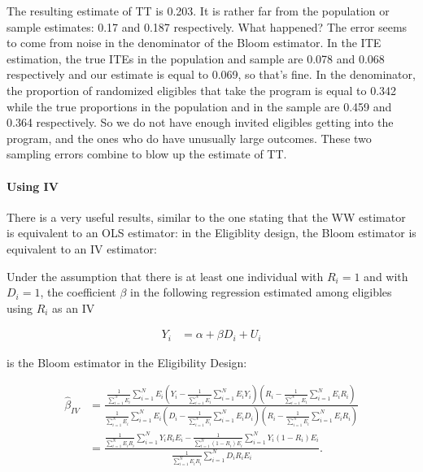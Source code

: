 \documentclass[]{book}
\let\oldparagraph\paragraph
\renewcommand{\paragraph}[1]{\oldparagraph{#1}\mbox{}}
\theoremstyle{definition}
\theoremstyle{definition}
\theoremstyle{definition}
\theoremstyle{remark}
\let\BeginKnitrBlock\begin \let\EndKnitrBlock\end
\begin{document}
The resulting estimate of TT is 0.203. It is rather far from the
population or sample estimates: 0.17 and 0.187 respectively. What
happened? The error seems to come from noise in the denominator of the
Bloom estimator. In the ITE estimation, the true ITEs in the population
and sample are 0.078 and 0.068 respectively and our estimate is equal to
0.069, so that's fine. In the denominator, the proportion of randomized
eligibles that take the program is equal to 0.342 while the true
proportions in the population and in the sample are 0.459 and 0.364
respectively. So we do not have enough invited eligibles getting into
the program, and the ones who do have unusually large outcomes. These
two sampling errors combine to blow up the estimate of TT.

\paragraph{Using IV}\label{using-iv}

There is a very useful results, similar to the one stating that the WW
estimator is equivalent to an OLS estimator: in the Eligiblity design,
the Bloom estimator is equivalent to an IV estimator:

\BeginKnitrBlock{theorem}[Bloom is IV]
\protect\hypertarget{thm:BloomIV}{}{\label{thm:BloomIV} \iffalse (Bloom is
IV) \fi{} }Under the assumption that there is at least one individual
with \(R_i=1\) and with \(D_i=1\), the coefficient \(\beta\) in the
following regression estimated among eligibles using \(R_i\) as an IV

\begin{align*}
        Y_i &  = \alpha + \beta D_i + U_i
    \end{align*}

is the Bloom estimator in the Eligibility Design:

\begin{align*}
\hat{\beta}_{IV} & = \frac{\frac{1}{\sum_{i=1}^N E_i}\sum_{i=1}^NE_i\left(Y_i-\frac{1}{\sum_{i=1}^N E_i}\sum_{i=1}^NE_iY_i\right)\left(R_i-\frac{1}{\sum_{i=1}^N E_i}\sum_{i=1}^NE_iR_i\right)}{\frac{1}{\sum_{i=1}^N E_i}\sum_{i=1}^NE_i\left(D_i-\frac{1}{\sum_{i=1}^N E_i}\sum_{i=1}^NE_iD_i\right)\left(R_i-\frac{1}{\sum_{i=1}^N E_i}\sum_{i=1}^NE_iR_i\right)} \\
                                & = \frac{\frac{1}{\sum_{i=1}^N E_iR_i}\sum_{i=1}^N Y_iR_iE_i-\frac{1}{\sum_{i=1}^N (1-R_i)E_i}\sum_{i=1}^N Y_i(1-R_i)E_i}{\frac{1}{\sum_{i=1}^N E_iR_i}\sum_{i=1}^N D_iR_iE_i}.
\end{align*}
\EndKnitrBlock{theorem}
\end{document}
